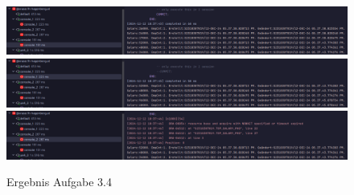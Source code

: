 \documentclass[12pt]{scrartcl}
\begin{document}
\begin{figure}[h]
	\centering
	\includegraphics[width=1\textwidth]{../ue4_3_session1_3.png}
	\includegraphics[width=1\textwidth]{../ue4_3_session2_2.png}
	\includegraphics[width=1\textwidth]{../ue4_3_session3_1.png}
	\caption{Ergebnis Aufgabe 3.4}
\end{figure}
\end{document}
